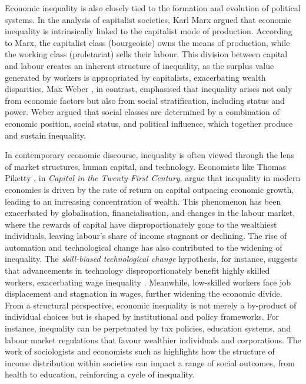 Economic inequality is also closely tied to the formation and evolution of political systems. In the analysis of capitalist societies, Karl Marx \parencite*{marx1867} argued that economic inequality is intrinsically linked to the capitalist mode of production. According to Marx, the capitalist class (bourgeoisie) owns the means of production, while the working class (proletariat) sells their labour. This division between capital and labour creates an inherent structure of inequality, as the surplus value generated by workers is appropriated by capitalists, exacerbating wealth disparities. Max Weber \parencite*{weber1922}, in contrast, emphasised that inequality arises not only from economic factors but also from social stratification, including status and power. Weber argued that social classes are determined by a combination of economic position, social status, and political influence, which together produce and sustain inequality.

In contemporary economic discourse, inequality is often viewed through the lens of market structures, human capital, and technology. Economists like Thomas Piketty \parencite*{piketty2014capital}, in \textit{Capital in the Twenty-First Century}, argue that inequality in modern economies is driven by the rate of return on capital outpacing economic growth, leading to an increasing concentration of wealth. This phenomenon has been exacerbated by globalisation, financialisation, and changes in the labour market, where the rewards of capital have disproportionately gone to the wealthiest individuals, leaving labour's share of income stagnant or declining. The rise of automation and technological change has also contributed to the widening of inequality. The \textit{skill-biased technological change} hypothesis, for instance, suggests that advancements in technology disproportionately benefit highly skilled workers, exacerbating wage inequality \parencite{acemoglu2002technical}. Meanwhile, low-skilled workers face job displacement and stagnation in wages, further widening the economic divide. From a structural perspective, economic inequality is not merely a by-product of individual choices but is shaped by institutional and policy frameworks. For instance, inequality can be perpetuated by tax policies, education systems, and labour market regulations that favour wealthier individuals and corporations. The work of sociologists and economists such as \textcite{Pickett2009} highlights how the structure of income distribution within societies can impact a range of social outcomes, from health to education, reinforcing a cycle of inequality. 

